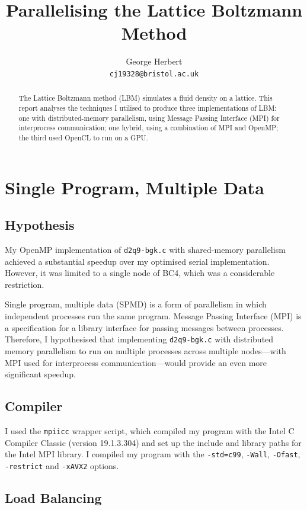 \documentclass[twocolumn, a4paper]{article}
\author{
  George Herbert\\
  \texttt{cj19328@bristol.ac.uk}
}
\title{\vspace{-2em}Parallelising the Lattice Boltzmann Method}
\begin{document}
\maketitle

\begin{abstract}
  The Lattice Boltzmann method (LBM) simulates a fluid density on a lattice.
  This report analyses the techniques I utilised to produce three implementations of LBM: one with distributed-memory parallelism, using Message Passing Interface (MPI) for interprocess communication; one hybrid, using a combination of MPI and OpenMP; the third used OpenCL to run on a GPU.
\end{abstract}

\section{Single Program, Multiple Data}

\subsection{Hypothesis}

My OpenMP implementation of \texttt{d2q9-bgk.c} with shared-memory parallelism achieved a substantial speedup over my optimised serial implementation.
However, it was limited to a single node of BC4, which was a considerable restriction.

Single program, multiple data (SPMD) is a form of parallelism in which independent processes run the same program.
Message Passing Interface (MPI) is a specification for a library interface for passing messages between processes.
Therefore, I hypothesised that implementing \texttt{d2q9-bgk.c} with distributed memory parallelism to run on multiple processes across multiple nodes---with MPI used for interprocess communication---would provide an even more significant speedup.

\subsection{Compiler}

I used the \texttt{mpiicc} wrapper script, which compiled my program with the Intel C Compiler Classic (version 19.1.3.304) and set up the include and library paths for the Intel MPI library.
I compiled my program with the \texttt{-std=c99}, \texttt{-Wall}, \texttt{-Ofast}, \texttt{-restrict} and \texttt{-xAVX2} options.

\subsection{Load Balancing}
\end{document}

